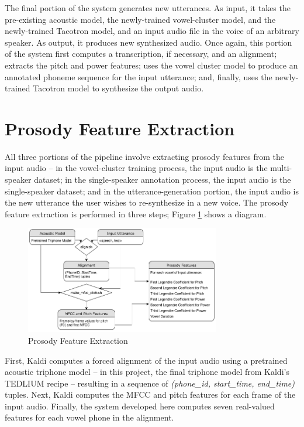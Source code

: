 \documentclass{article}
\begin{document}
The final portion of the system generates new utterances. As input, it takes the pre-existing acoustic model, the newly-trained vowel-cluster model, and the newly-trained Tacotron model, and an input audio file in the voice of an arbitrary speaker. As output, it produces new synthesized audio. Once again, this portion of the system first computes a transcription, if necessary, and an alignment; extracts the pitch and power features; uses the vowel cluster model to produce an annotated phoneme sequence for the input utterance; and, finally, uses the newly-trained Tacotron model to synthesize the output audio.

\section{Prosody Feature Extraction}
\label{sec:prosody}

All three portions of the pipeline involve extracting prosody features from the input audio -- in the vowel-cluster training process, the input audio is the multi-speaker dataset; in the single-speaker annotation process, the input audio is the single-speaker dataset; and in the utterance-generation portion, the input audio is the new utterance the user wishes to re-synthesize in a new voice.
The prosody feature extraction is performed in three steps; Figure \ref{fig:prosodyextraction} shows a diagram.

\begin{figure}[htb]

\begin{minipage}[b]{1.0\linewidth}
  \centering
  \centerline{\includegraphics[width=8.5cm]{Prosody_Extraction.png}}
\end{minipage}
\caption{Prosody Feature Extraction}
\label{fig:prosodyextraction}
\end{figure}

First, Kaldi computes a forced alignment of the input audio using a pretrained acoustic triphone model -- in this project, the final triphone model from Kaldi's TEDLIUM recipe -- resulting in a sequence of \textit{(phone\_id, start\_time, end\_time)} tuples.
Next, Kaldi computes the MFCC and pitch features for each frame of the input audio. Finally, the system developed here computes seven real-valued features for each vowel phone in the alignment.
\end{document}
